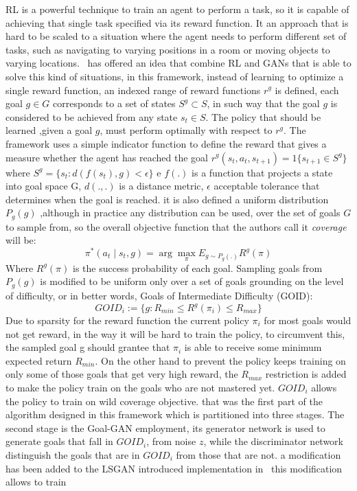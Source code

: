 RL is a powerful technique to train an agent to perform a task, so it is capable of achieving that single task specified via its reward function. It an approach that is hard to be scaled to a situation where the agent needs to perform different set of tasks,  such as navigating to varying positions in a room or moving objects to varying locations.~\cite{held2018automatic} has offered an idea that combine RL and GANs that is able to solve this kind of situations, in this framework, instead of learning to optimize a single reward function, an indexed range of reward functions $r^g$ is defined, each goal $g \in G$ corresponds to a set of states $S^g \subset S$, in such way that the goal $g$ is considered to be achieved from any state $s_t \in S$. The policy that should be learned ,given a goal $g$, must perform optimally with respect to $r^g$. The framework uses a simple indicator function to define the reward that gives a measure whether the agent has reached the goal $r^g(s_t, a_t, s_{t+1})=1 \{s_{t+1} \in S^g\}$ where $S^g = \{s_t : d(f(s_t), g)< \epsilon\}$ e $f(.)$ is a function that projects a state into goal space G, $d(.,.)$ is a distance metric, $\epsilon$ acceptable tolerance that determines when the goal is reached. it is also defined a uniform distribution $P_g(g)$ ,although in practice any distribution can be used, over the set of goals $G$ to sample from, so the overall objective function that the authors call it \textit{coverage} will be:
\begin{equation}
\pi^*(a_t \mid s_t, g)= \arg{\max_{\pi}}{E_{g\sim P_g(.)} R^g(\pi) }
\end{equation}
Where $R^g(\pi)$ is the success probability of each goal. Sampling goals from $P_g(g)$ is modified to be uniform only over a set of goals grounding on the level of difficulty, or in better words, Goals of Intermediate Difficulty (GOID):
\begin{equation}
GOID_i := \{ g : R_{min} \leqslant R^g(\pi_i) \leqslant R_{max}\}
\end{equation}
Due to sparsity for the reward function the current policy $\pi_i$ for most goals would not get reward, in the way it will be hard to train the policy, to circumvent this, the sampled goal g should grantee that $\pi_i$ is able to receive some minimum expected return $R_{min}$. On the other hand to prevent the policy keeps training on only some of those goals that get very high reward, the $R_{max}$ restriction is added to make the policy train on the goals who are not mastered yet. $GOID_i$ allows the policy to train on wild coverage objective. that was the first part of the algorithm designed in this framework which is partitioned into three stages. The second stage is the Goal-GAN employment, its generator network is used to generate goals that fall in $GOID_i$, from noise $z$, while the discriminator network distinguish the goals that are in $GOID_i$ from those that are not. a modification has been added to the LSGAN introduced implementation in~\citealp{Mao_2017_ICCV} this modification allows to train
